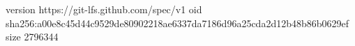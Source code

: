 version https://git-lfs.github.com/spec/v1
oid sha256:a00e8c45d44c9529de80902218ae6337da7186d96a25cda2d12b48b86b0629ef
size 2796344
